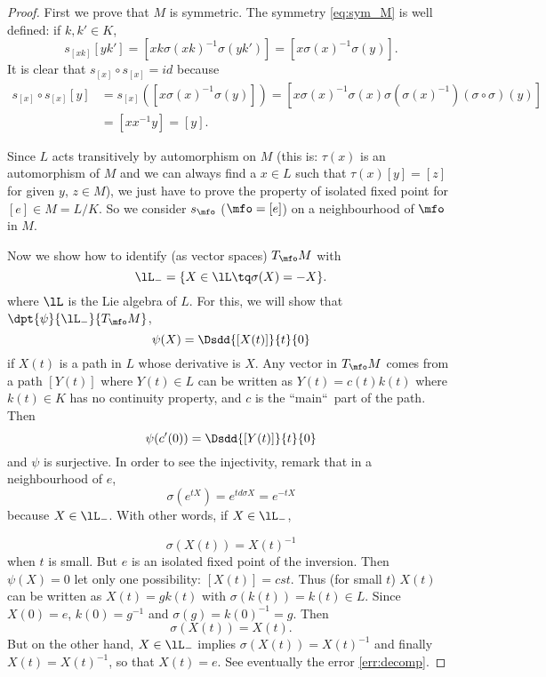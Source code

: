 \begin{proof}
  First we prove that $M$ is symmetric. The symmetry \eqref{eq:sym_M} is well defined: if $k,k'\in K$,
  \begin{equation}
  s_{[xk]}[yk']=[xk\sigma(xk)^{-1}\sigma(yk')]
               =[x\sigma(x)^{-1}\sigma(y)].
\end{equation}
 It is clear that $s_{[x]}\circ s_{[x]}=id$ because
\begin{equation}
\begin{split}
  s_{[x]}\circ s_{[x]}[y]&=s_{[x]}([ x\sigma(x)^{-1}\sigma(y) ])
                         =[x\sigma(x)^{-1}\sigma(x)\sigma(\sigma(x)^{-1})(\sigma\circ\sigma)(y)]\\
			 &=[xx^{-1} y]
			 =[y].
\end{split}
\end{equation}

Since $L$ acts transitively by automorphism on $M$ (this is: $\tau(x)$ is an automorphism of $M$ and we can always find a $x\in L$ such that $\tau(x)[y]=[z]$ for given $y$, $z\in M$), we just have to prove the property of isolated fixed point for $[e]\in M=L/K$. So we consider $s_{\mfo}$ ($\mfo=[e]$) on a neighbourhood of $\mfo$ in $M$.

Now we show how to identify (as vector spaces) $T_{\mfo}M$ with
\[
   \lL_-=\{X\in\lL\tq \sigma(X)=-X\}.
\]
where $\lL$ is the Lie algebra of $L$. For this, we will show that $\dpt{\psi}{\lL_-}{T_{\mfo}M}$,
\begin{equation}
  \psi(X)=\Dsdd{[X(t)]}{t}{0}
\end{equation}
if $X(t)$ is a path in $L$ whose derivative is $X$. Any vector in $T_{\mfo}M$ comes from a path $[Y(t)]$ where $Y(t)\in L$ can be written as $Y(t)=c(t)k(t)$ where $k(t)\in K$ has no continuity property, and $c$ is the ``main``\ part of the path. Then
\[
  \psi(c'(0))=\Dsdd{ [Y(t)] }{t}{0}
\]
and $\psi$ is surjective. In order to see the injectivity, remark that in a neighbourhood of $e$,
\[
   \sigma(e^{tX})=e^{td\sigma X}=e^{-tX}
\]
because $X\in\lL_-$. With other words, if $X\in\lL_-$,

 \[
    \sigma(X(t))=X(t)^{-1}
 \]
when $t$ is small. But $e$ is an isolated fixed point of the inversion. Then $\psi(X)=0$ let only one possibility: $[X(t)]=cst$. Thus (for small $t$) $X(t)$ can be written as $X(t)=gk(t)$ with $\sigma(k(t))=k(t)\in L$. Since $X(0)=e$, $k(0)=g^{-1}$ and $\sigma(g)=k(0)^{-1}=g$. Then
 \[
   \sigma(X(t))=X(t).
 \]
But on the other hand, $X\in\lL_-$ implies $\sigma(X(t))=X(t)^{-1}$ and finally $X(t)=X(t)^{-1}$, so that $X(t)=e$. See eventually the error \ref{err:decomp}\label{pg:X_t}.


\end{proof}
